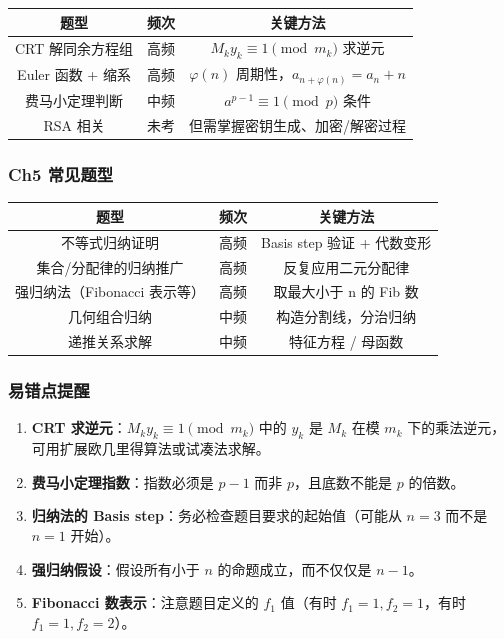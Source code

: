\documentclass[10pt,a4paper,openany]{ctexbook}
\theoremstyle{definition}
\theoremstyle{remark}
\begin{document}
\begin{center}
\begin{tabular}{ccc}
\hline
题型 & 频次 & 关键方法 \\ \hline
CRT 解同余方程组 & 高频 & $M_k y_k \equiv 1 \pmod{m_k}$ 求逆元 \\
Euler 函数 + 缩系 & 高频 & $\varphi(n)$ 周期性，$a_{n+\varphi(n)} = a_n + n$ \\
费马小定理判断 & 中频 & $a^{p-1} \equiv 1 \pmod{p}$ 条件 \\
RSA 相关 & 未考 & 但需掌握密钥生成、加密/解密过程 \\
\hline
\end{tabular}

\end{center}

\subsubsection{Ch5 常见题型}

\begin{center}
\begin{tabular}{ccc}
\hline
题型 & 频次 & 关键方法 \\ \hline
不等式归纳证明 & 高频 & Basis step 验证 + 代数变形 \\
集合/分配律的归纳推广 & 高频 & 反复应用二元分配律 \\
强归纳法（Fibonacci 表示等） & 高频 & 取最大小于 n 的 Fib 数 \\
几何组合归纳 & 中频 & 构造分割线，分治归纳 \\
递推关系求解 & 中频 & 特征方程 / 母函数 \\
\hline
\end{tabular}

\end{center}

\subsubsection{易错点提醒}

\begin{enumerate}
\item \textbf{CRT 求逆元}：$M_k y_k \equiv 1 \pmod{m_k}$ 中的 $y_k$ 是 $M_k$ 在模 $m_k$ 下的乘法逆元，可用扩展欧几里得算法或试凑法求解。
\item \textbf{费马小定理指数}：指数必须是 $p-1$ 而非 $p$，且底数不能是 $p$ 的倍数。
\item \textbf{归纳法的 Basis step}：务必检查题目要求的起始值（可能从 $n=3$ 而不是 $n=1$ 开始）。
\item \textbf{强归纳假设}：假设所有小于 $n$ 的命题成立，而不仅仅是 $n-1$。
\item \textbf{Fibonacci 数表示}：注意题目定义的 $f_1$ 值（有时 $f_1=1, f_2=1$，有时 $f_1=1, f_2=2$）。

\end{enumerate}
\end{document}
